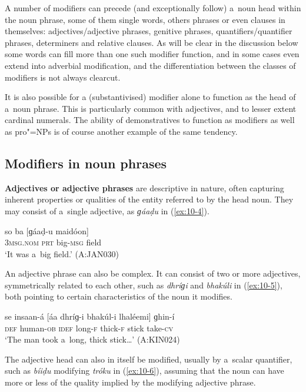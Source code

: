 A number of modifiers can precede (and exceptionally follow) a~noun head within the noun phrase, some of them single words, others phrases or even clauses in themselves: adjectives/adjective phrases, genitive phrases, quantifiers/quantifier phrases, determiners and relative clauses. As will be clear in the discussion below some words can fill more than one such modifier function, and in some cases even extend into adverbial modification, and the differentiation between the classes of modifiers is not always clearcut.


It is also possible for a (substantivised) modifier alone to function as the head of a~noun phrase. This is particularly common with adjectives, and to lesser extent cardinal numerals. The ability of demonstratives to function as modifiers as well as pro"=NPs is of course another example of the same tendency.


\subsection{Modifiers in noun phrases}
\label{subsec:10-1-2}


\textbf{Adjectives or adjective phrases} are descriptive in nature, often capturing inherent properties or qualities of the entity referred to by the head noun. They may consist of a~single adjective, as \textit{ɡáaḍu} in (\ref{ex:10-4}).

\begin{exe}
\ex
\label{ex:10-4}
\gll so ba [ɡáaḍ-u maidóon] \\
\textsc{3msg.nom} \textsc{prt} big-\textsc{msg} field \\
\glt `It was a~big field.' (A:JAN030)
\end{exe}

An adjective phrase can also be complex. It can consist of two or more adjectives, symmetrically related to each other, such as \textit{dhríɡi} and \textit{bhakúli} in (\ref{ex:10-5}), both pointing to certain characteristics of the noun it modifies. 

\begin{exe}
\ex
\label{ex:10-5}
\gll se insaan-á [áa dhríɡ-i bhakúl-i lhaléemi] ɡhin-í \\
\textsc{def} human-\textsc{ob} \textsc{idef} long-\textsc{f} thick-\textsc{f} stick  take-\textsc{cv} \\
\glt `The man took a~long, thick stick{\ldots}' (A:KIN024)
\end{exe}

The adjective head can also in itself be modified, usually by a~scalar quantifier, such as \textit{bíiḍu} modifying \textit{tróku} in (\ref{ex:10-6}), assuming that the noun can have more or less of the quality implied by the modifying adjective phrase. 

